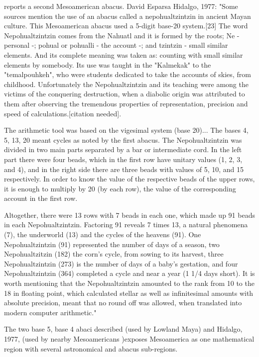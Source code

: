 \documentclass[12pt]{article}
\begin{document}
{ reports a second Mesoamerican abacus. David Esparsa Hidalgo, 1977: "Some sources mention the use of an abacus called a nepohualtzintzin in ancient Mayan culture. This Mesoamerican abacus used a 5-digit base-20 system.[23] The word Nepohualtzintzin comes from the Nahuatl and it is formed by the roots; Ne - personal -; pohual or pohualli - the account -; and tzintzin - small similar elements. And its complete meaning was taken as: counting with small similar elements by somebody. Its use was taught in the "Kalmekak" to the "temalpouhkeh", who were students dedicated to take the accounts of skies, from childhood. Unfortunately the Nepohualtzintzin and its teaching were among the victims of the conquering destruction, when a diabolic origin was attributed to them after observing the tremendous properties of representation, precision and speed of calculations.[citation needed].

The arithmetic tool was based on the vigesimal system (base 20)... The bases 4, 5, 13, 20 meant cycles as noted by the first abacus. The Nepohualtzintzin was divided in two main parts separated by a bar or intermediate cord. In the left part there were four beads, which in the first row have unitary values (1, 2, 3, and 4), and in the right side there are three beads with values of 5, 10, and 15 respectively. In order to know the value of the respective beads of the upper rows, it is enough to multiply by 20 (by each row), the value of the corresponding account in the first row.

Altogether, there were 13 rows with 7 beads in each one, which made up 91 beads in each Nepohualtzintzin. Factoring 91 reveals 7 times 13, a natural phenomena (7), the underworld (13) and the cycles of the heavens (91). One Nepohualtzintzin (91) represented the number of days of a season, two Nepohualtzitzin (182) the corn's cycle, from sowing to its harvest, three Nepohualtzintzin (273) is the number of days of a baby's gestation, and four Nepohualtzintzin (364) completed a cycle and near a year (1 1/4 days short). It is worth mentioning that the Nepohualtzintzin amounted to the rank from 10 to the 18 in floating point, which calculated stellar as well as infinitesimal amounts with absolute precision, meant that no round off was allowed, when translated into modern computer arithmetic."

The two base 5, base 4 abaci described  (used by Lowland Maya) and Hidalgo, 1977, (used by nearby  Mesoamericans )exposes Mesoamerica as one mathematical region with several astronomical and abacus sub-regions.

}
\end{document}
